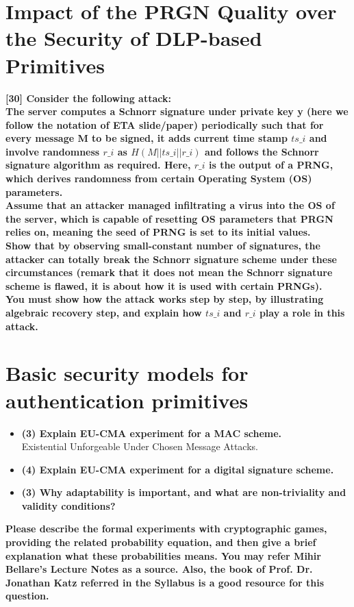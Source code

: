 \documentclass[letterpaper,11pt,notitlepage,fleqn]{article}
\begin{document}
\section{Impact of the PRGN Quality over the Security of DLP-based Primitives}
\noindent \textbf{[30] Consider the following attack:}\\ 
\textbf{The server computes a Schnorr signature under private key y (here we follow the notation of ETA slide/paper) periodically such that for every message M to be signed, it adds current time  stamp  $ts\_i$  and  involve  randomness  $r\_i$  as  $H(M||ts\_i||r\_i)$  and  follows  the  Schnorr signature  algorithm  as  required.  Here,  $r\_i$  is  the  output  of  a  PRNG,  which  derives randomness from certain Operating System (OS) parameters.}  \\
\textbf {Assume  that  an  attacker  managed  infiltrating  a  virus  into  the  OS  of  the  server,  which  is capable of resetting OS parameters that PRGN relies on, meaning the seed of PRNG is set to its initial values.} \\
\textbf{Show that by observing small-constant number of signatures, the attacker can totally break the Schnorr signature scheme under these circumstances (remark that it does not mean the Schnorr signature scheme is flawed, it is about how it is used with certain PRNGs).} \\
\textbf{You must show how the attack works step by step, by illustrating algebraic recovery step, and explain how $ts\_i$ and $r\_i$ play a role in this attack.}

\section{Basic security models for authentication primitives}
\begin{itemize}
    \item \textbf{(3) Explain EU-CMA experiment for a MAC scheme.} \\
        Existential Unforgeable Under Chosen Message Attacks. 
    \item \textbf{(4) Explain EU-CMA experiment for a digital signature scheme.}
    \item \textbf{(3) Why adaptability is important, and what are non-triviality and  validity conditions?}
\end{itemize}
 
\noindent \textbf{Please  describe  the  formal  experiments  with  cryptographic  games,  providing  the  related probability equation, and then give a brief explanation what these probabilities means. You may refer Mihir Bellare’s Lecture Notes as a source. Also, the book of Prof. Dr. Jonathan Katz referred in the Syllabus is a good resource for this question.}
\end{document}
